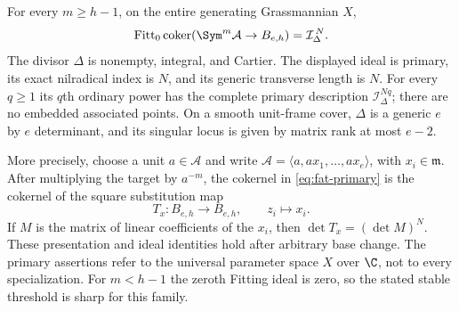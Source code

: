 \begin{theorem}
\label{thm:fat-primary}
For every $m\ge h-1$, on the entire generating Grassmannian $X$,
\begin{equation}\label{eq:fat-primary}
 \operatorname{Fitt}_0\operatorname{coker}(\Sym^m\mathcal A\to B_{e,h})
       =\mathcal I_\Delta^{\,N}.
\end{equation}
The divisor $\Delta$ is nonempty, integral, and Cartier. The displayed
ideal is primary, its exact nilradical index is $N$, and its generic
transverse length is $N$. For every $q\ge1$ its $q$th ordinary power
has the complete primary description $\mathcal I_\Delta^{Nq}$;
there are no embedded associated points. On a smooth unit-frame cover,
$\Delta$ is a generic $e$ by $e$ determinant, and its singular locus
is given by matrix rank at most $e-2$.

More precisely, choose a unit $a\in\mathcal A$ and write
$\mathcal A=\langle a,ax_1,\ldots,ax_e\rangle$, with $x_i\in\mathfrak m$.
After multiplying the target by $a^{-m}$, the cokernel in
\eqref{eq:fat-primary} is the cokernel of the square substitution map
\[
 T_x:B_{e,h}\longrightarrow B_{e,h},\qquad z_i\longmapsto x_i.
\]
If $M$ is the matrix of linear coefficients of the $x_i$, then
$\det T_x=(\det M)^N$. These presentation and ideal identities hold
after arbitrary base change. The primary assertions refer to the
universal parameter space $X$ over $\C$, not to every specialization.
For $m<h-1$ the zeroth Fitting ideal is zero, so the stated stable
threshold is sharp for this family.
\end{theorem}
